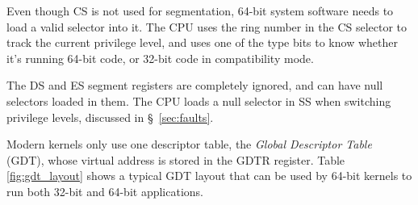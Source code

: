 Even though CS is not used for segmentation, 64-bit system software needs to
load a valid selector into it. The CPU uses the ring number in the CS selector
to track the current privilege level, and uses one of the type bits to know
whether it's running 64-bit code, or 32-bit code in compatibility mode.


The DS and ES segment registers are completely ignored, and can have null
selectors loaded in them. The CPU loads a null selector in SS when switching
privilege levels, discussed in \S~\ref{sec:faults}.


Modern kernels only use one descriptor table, the \textit{Global Descriptor
Table} (GDT), whose virtual address is stored in the GDTR register. Table~
\ref{fig:gdt_layout} shows a typical GDT layout that can be used by 64-bit
kernels to run both 32-bit and 64-bit applications.

\begin{table}[hbt]
  \caption{
    A typical GDT layout in the 64-bit Intel Architecture.
  }
  \label{fig:gdt_layout}
\end{table}

